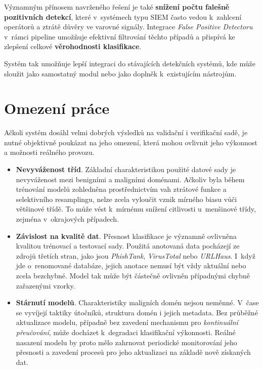 Významným přínosem navrženého řešení je také \textbf{snížení počtu falešně pozitivních detekcí}, které v~systémech typu SIEM často vedou k~zahlcení operátorů a ztrátě důvěry ve varovné signály. Integrace \textit{False Positive Detectoru} v~rámci pipeline umožňuje efektivní filtrování těchto případů a přispívá ke zlepšení celkové \textbf{věrohodnosti klasifikace}. 

Systém tak umožňuje lepší integraci do stávajících detekčních systémů, kde může sloužit jako samostatný modul nebo jako doplněk k~existujícím nástrojům.

\section{Omezení práce}
\label{sec:discussion-limitations}

Ačkoli systém dosáhl velmi dobrých výsledků na validační i verifikační sadě, je nutné objektivně poukázat na jeho omezení, která mohou ovlivnit jeho výkonnost a možnosti reálného provozu.

\begin{itemize}
    \item \textbf{Nevyváženost tříd}. Základní charakteristikou použité datové sady je nevyváženost mezi benigními a maligními doménami. Ačkoliv byla během trénování modelů zohledněna prostřednictvím vah ztrátové funkce a selektivního resamplingu, nelze zcela vyloučit vznik mírného biasu vůči většinové třídě. To může vést k~mírnému snížení citlivosti u~menšinové třídy, zejména v~okrajových případech.

    \item \textbf{Závislost na kvalitě dat}. Přesnost klasifikace je významně ovlivněna kvalitou trénovací a testovací sady. Použitá anotovaná data pocházejí ze zdrojů třetích stran, jako jsou \emph{PhishTank}, \emph{VirusTotal} nebo \emph{URLHaus}. I~když jde o~renomované databáze, jejich anotace nemusí být vždy aktuální nebo zcela bezchybné. Model tak může být částečně ovlivněn případnými chybně zařazenými vzorky.

    \item \textbf{Stárnutí modelů}. Charakteristiky maligních domén nejsou neměnné. V~čase se vyvíjejí taktiky útočníků, struktura domén i jejich metadata. Bez průběžné aktualizace modelu, případně bez zavedení mechanismu pro \emph{kontinuální přeučování}, může docházet k~degradaci klasifikační výkonnosti. Reálné nasazení modelu by proto mělo zahrnovat periodické monitorování jeho přesnosti a zavedení procesů pro jeho aktualizaci na základě nově získaných dat.
\end{itemize}



